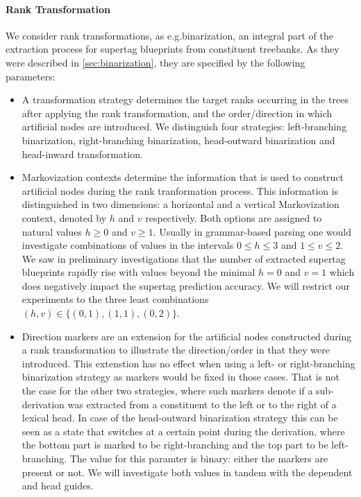 \documentclass[../../document.tex]{subfiles}
\begin{document}
    \paragraph*{Rank Transformation}
    We consider rank transformations, as e.g.\@ binarization, an integral part of the extraction process for supertag blueprints from constituent treebanks.
    As they were described in \cref{sec:binarization}, they are specified by the following parameters:
    \begin{itemize}
        \item A transformation strategy determines the target ranks occurring in the trees after applying the rank transformation, and the order/direction in which artificial nodes are  introduced. We distinguish four strategies: left-branching binarization, right-branching binarization, head-outward binarization and head-inward transformation.
        \item Markovization contexts determine the information that is used to construct artificial nodes during the rank tranformation process. This information is distinguished in two dimensions: a horizontal and a vertical Markovization context, denoted by \(h\) and \(v\) respectively. Both options are assigned to natural values \(h \ge 0\) and \(v \ge 1\). Usually in grammar-based parsing one would investigate combinations of values in the intervals \(0 \le h \le 3\) and \(1 \le v \le 2\). We saw in preliminary investigations that the number of extracted supertag blueprints rapidly rise with values beyond the minimal \(h = 0\) and \(v = 1\) which does negatively impact the supertag prediction accuracy. \citep{Rup22} We will restrict our experiments to the three least combinations \((h, v) \in \{(0,1), (1,1), (0,2)\}\).
        \item Direction markers are an extension for the artificial nodes constructed during a rank transformation to illustrate the direction/order in that they were introduced. This extenstion has no effect when using a left- or right-branching binarization strategy as markers would be fixed in those cases. That is not the case for the other two strategies, where such markers denote if a sub-derivation was extracted from a constituent to the left or to the right of a lexical head. In case of the head-outward binarization strategy this can be seen as a state that switches at a certain point during the derivation, where the bottom part is marked to be right-branching and the top part to be left-branching. The value for this paramter is binary: either the markers are present or not. We will investigate both values in tandem with the dependent and head guides.

\end{itemize}
\end{document}
